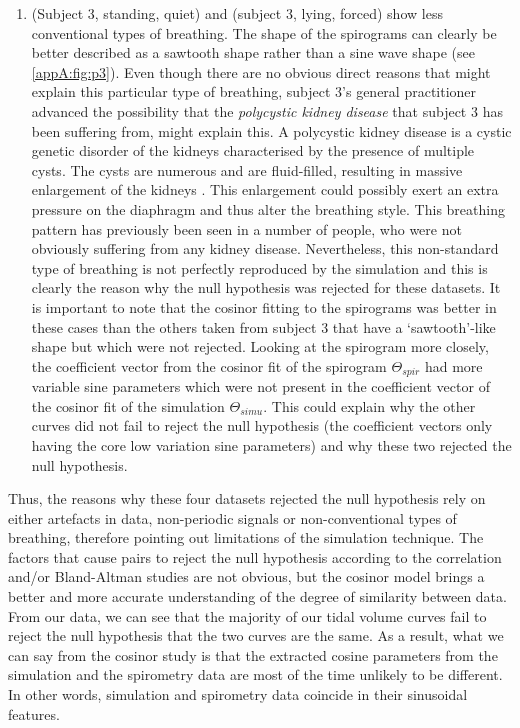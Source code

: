 \begin{enumerate}
\item (Subject 3, standing, quiet) and (subject 3, lying, forced) show less conventional types of breathing. The shape of the spirograms can clearly be better described as a sawtooth shape rather than a sine wave shape (see \ref{appA:fig:p3}). Even though there are no obvious direct reasons that might explain this particular type of breathing, subject 3's general practitioner advanced the possibility that the \emph{polycystic kidney disease} that subject 3 has been suffering from, might explain this. A polycystic kidney disease is a cystic genetic disorder of the kidneys characterised by the presence of multiple cysts. The cysts are numerous and are fluid-filled, resulting in massive enlargement of the kidneys \cite{bisceglia2006renal}. This enlargement could possibly exert an extra pressure on the diaphragm and thus alter the breathing style. This breathing pattern has previously been seen in a number of people, who were not obviously suffering from any kidney disease. Nevertheless, this non-standard type of breathing is not perfectly reproduced by the simulation and this is clearly the reason why the null hypothesis was rejected for these datasets. It is important to note that the cosinor fitting to the spirograms was better in these cases than the others taken from subject 3 that have a `sawtooth'-like shape but which were not rejected. Looking at the spirogram more closely, the coefficient vector from the cosinor fit of the spirogram $\Theta_{spir}$ had more variable sine parameters which were not present in the coefficient vector of the cosinor fit of the simulation $\Theta_{simu}$. This could explain why the other curves did not fail to reject the null hypothesis (the coefficient vectors only having the core low variation sine parameters) and why these two rejected the null hypothesis.
 
\end{enumerate}
 
Thus, the reasons why these four datasets rejected the null hypothesis rely on either artefacts in data, non-periodic signals or non-conventional types of breathing, therefore pointing out limitations of the simulation technique. The factors that cause pairs to reject the null hypothesis according to the correlation and/or Bland-Altman studies are not obvious, but the cosinor model brings a better and more accurate understanding of the degree of similarity between data. 
From our data, we can see that the majority of our tidal volume curves fail to reject the null hypothesis that the two curves are the same. As a result, what we can say from the cosinor study is that the extracted cosine parameters from the simulation and the spirometry data are most of the time unlikely to be different. In other words, simulation and spirometry data coincide in their sinusoidal features.

